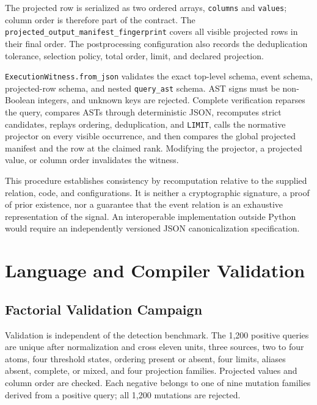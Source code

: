 \documentclass[11pt,a4paper]{article}
\newcommand{\code}[1]{\texttt{#1}}
\begin{document}
The projected row is serialized as two ordered arrays, \code{columns} and \code{values}; column order is therefore part of the contract. The \code{projected\_output\_manifest\_fingerprint} covers all visible projected rows in their final order. The postprocessing configuration also records the deduplication tolerance, selection policy, total order, limit, and declared projection.

\code{ExecutionWitness.from\_json} validates the exact top-level schema, event schema, projected-row schema, and nested \code{query\_ast} schema. AST signs must be non-Boolean integers, and unknown keys are rejected. Complete verification reparses the query, compares ASTs through deterministic JSON, recomputes strict candidates, replays ordering, deduplication, and \code{LIMIT}, calls the normative projector on every visible occurrence, and then compares the global projected manifest and the row at the claimed rank. Modifying the projector, a projected value, or column order invalidates the witness.

This procedure establishes consistency by recomputation relative to the supplied relation, code, and configurations. It is neither a cryptographic signature, a proof of prior existence, nor a guarantee that the event relation is an exhaustive representation of the signal. An interoperable implementation outside Python would require an independently versioned JSON canonicalization specification.

\section{Language and Compiler Validation}

\subsection{Factorial Validation Campaign}

Validation is independent of the detection benchmark. The 1,200 positive queries are unique after normalization and cross eleven units, three sources, two to four atoms, four threshold states, ordering present or absent, four limits, aliases absent, complete, or mixed, and four projection families. Projected values and column order are checked. Each negative belongs to one of nine mutation families derived from a positive query; all 1,200 mutations are rejected.
\end{document}
